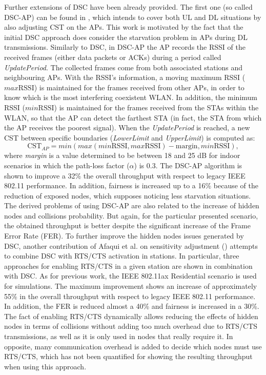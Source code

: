 \documentclass[12pt, a4paper,twoside]{tesi_upf}
\begin{document}
				Further extensions of DSC have been already provided. The first one (so called DSC-AP) can be found in \cite{afaqui2016dynamic}, which intends to cover both UL and DL situations by also adjusting CST on the APs. This work is motivated by the fact that the initial DSC approach does consider the starvation problem in APs during DL transmissions. Similarly to DSC, in DSC-AP the AP records the RSSI of the received frames (either data packets or ACKs) during a period called \textit{UpdatePeriod}. The collected frames come from both associated stations and neighbouring APs. With the RSSI's information, a moving maximum RSSI ($max\mathrm{RSSI}$) is maintained for the frames received from other APs, in order to know which is the most interfering coexistent WLAN. In addition, the minimum RSSI ($min\mathrm{RSSI}$) is maintained for the frames received from the STAs within the WLAN, so that the AP can detect the farthest STA (in fact, the STA from which the AP receives the poorest signal). When the \textit{UpdatePeriod} is reached, a new CST between specific boundaries (\textit{LowerLimit} and \textit{UpperLimit}) is computed as:
				\begin{equation}
					\mathrm{CST}_{AP} = min(max(min\mathrm{RSSI}, max\mathrm{RSSI})- \text{margin}, min\mathrm{RSSI}),
					\nonumber
				\end{equation}
				where \textit{margin} is a value determined to be between 18 and 25 dB for indoor scenarios in which the path-loss factor ($\alpha$) is 0.3. The DSC-AP algorithm is shown to improve a 32\% the overall throughput with respect to legacy IEEE 802.11 performance. In addition, fairness is increased up to a 16\% because of the reduction of exposed nodes, which supposes noticing less starvation situations. The derived problems of using DSC-AP are also related to the increase of hidden nodes and collisions probability. But again, for the particular presented scenario, the obtained throughput is better despite the significant increase of the Frame Error Rate (FER).	To further improve the hidden nodes issues generated by DSC, another contribution of Afaqui et al. on sensitivity adjustment (\cite{afaqui2016rtscts}) attempts to combine DSC with RTS/CTS activation in stations. In particular, three approaches for enabling RTS/CTS in a given station are shown in combination with DSC. As for previous work, the IEEE 802.11ax Residential scenario is used for simulations. The maximum improvement shows an increase of approximately 55\% in the overall throughput with respect to legacy IEEE 802.11 performance. In addition, the FER is reduced almost a 40\% and fairness is increased in a 30\%. The fact of enabling RTS/CTS dynamically allows reducing the effects of hidden nodes in terms of collisions without adding too much overhead due to RTS/CTS transmissions, as well as it is only used in nodes that really require it. In opposite, many communication overhead is added to decide which nodes must use RTS/CTS, which has not been quantified for showing the resulting throughput when using this approach.
			
\end{document}
